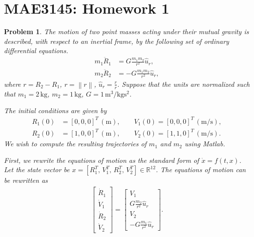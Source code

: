 \documentclass[10pt]{article}
\date{}
\newcommand{\norm}[1]{\ensuremath{\left\| #1 \right\|}}
\renewcommand{\Re}{\ensuremath{\mathbb{R}}}
\theoremstyle{plain}\theorembodyfont{\normalfont}
\newtheorem{prob}{Problem}[section]
\newenvironment{subprob}%
{\renewcommand{\theenumi}{\alph{enumi}}\renewcommand{\labelenumi}{(\theenumi)}\begin{enumerate}}%
{\end{enumerate}}%
\begin{document}
\pagestyle{empty}
\section*{MAE3145: Homework 1}
\vspace*{-0.4cm}

\begin{prob}
The motion of two point masses acting under their mutual gravity is described, with respect to an inertial frame, by the following set of ordinary differential equations.
\begin{align}
m_1\ddot{{R}}_1 & = G \frac{m_1 m_2}{r^2} \hat u_r,\\
m_2\ddot{{R}}_2 & = -G \frac{m_1 m_2}{r^2} \hat u_r,
\end{align}
where $ r= R_2 - R_1$, $r=\norm{ r}$, $\hat u_r = \frac{ r}{r}$. Suppose that the units are normalized such that $m_1=2\,\mathrm{kg}$, $m_2=1\,\mathrm{kg}$, $G=1\,\mathrm{m^3/kg s^2}$.

The initial conditions are given by
\begin{align*}
 R_1(0)&=[0,0,0]^T\,(\mathrm{m}), \qquad  V_1(0)=[0,0,0]^T\,(\mathrm{m/s}),\\
 R_2(0)&=[1,0,0]^T\,(\mathrm{m}), \qquad  V_2(0)=[1,1,0]^T\,(\mathrm{m/s}).
\end{align*}
We wish to compute the resulting trajectories of $m_1$ and $m_2$ using Matlab. 


First, we rewrite the equations of motion as the standard form of $\dot x = f(t,x)$. Let the state vector be $x=[R_1^T,\,V_1^T,\, R_2^T,\, V_2^T]\in\Re^{12}$. The equations of motion can be rewritten as
\begin{align}
\begin{bmatrix} \dot R_1 \\ \dot V_1 \\ \dot R_2 \\ \dot V_2\end{bmatrix}
=
\begin{bmatrix}
V_1 \\
G\frac{m_2}{r^2} \hat u_r\\
V_2 \\
-G\frac{m_1}{r^2} \hat u_r
\end{bmatrix}.
\end{align}


\begin{subprob}


\end{subprob}
\end{prob}
\end{document}
